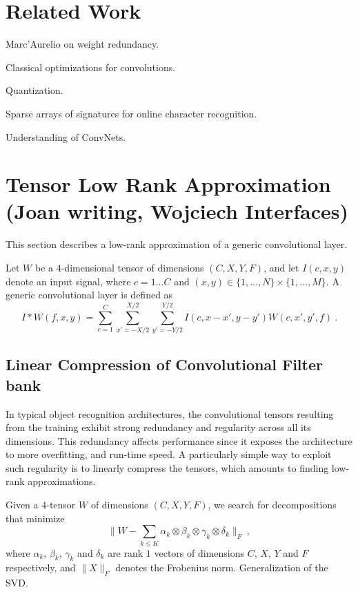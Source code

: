 \documentclass{article}
\begin{document}
\section{Related Work}

Marc'Aurelio on weight redundancy.

Classical optimizations for convolutions. 

Quantization.

Sparse arrays of signatures for online character
recognition.

Understanding of ConvNets. 


\section{Tensor Low Rank Approximation (Joan writing, Wojciech Interfaces)}

This section describes a low-rank approximation of a generic 
convolutional layer. 

Let $W$ be a $4$-dimensional tensor of dimensions $(C,X,Y,F)$,
and let $I(c,x,y)$ denote an input signal, 
where $c=1\dots C$ and $(x,y) \in \{1,\dots,N\}\times \{1,\dots,M\}$.
A generic convolutional layer is defined as
\begin{equation}
\label{convlayereq}
I \ast W (f,x,y) = \sum_{c=1}^C \sum_{x'=-X/2}^{X/2} \sum_{y'=-Y/2}^{Y/2} I(c,x-x',y-y') W(c,x',y',f)~.
\end{equation}

\subsection{Linear Compression of Convolutional Filter bank}

In typical object recognition architectures, the convolutional tensors resulting
from the training exhibit strong redundancy and regularity across all its 
dimensions. This redundancy affects performance since it exposes
the architecture to more overfitting, and run-time speed. 
A particularly simple way to exploit such regularity is to 
linearly compress the tensors, which amounts to finding low-rank 
approximations.

Given a $4$-tensor $W$ of dimensions $(C,X,Y,F)$, we search for decompositions 
that minimize 
\begin{equation}
\label{rankoptim}
\| W - \sum_{k\leq K} \alpha_k \otimes \beta_k \otimes \gamma_k \otimes \delta_k\|_F~,
\end{equation}
where $\alpha_k$, $\beta_k$, $\gamma_k$ and $\delta_k$ are 
rank $1$ vectors of dimensions $C$, $X$, $Y$ and $F$ respectively, and
$\| X \|_F$ denotes the Frobenius norm. Generalization of the SVD.
\end{document}
